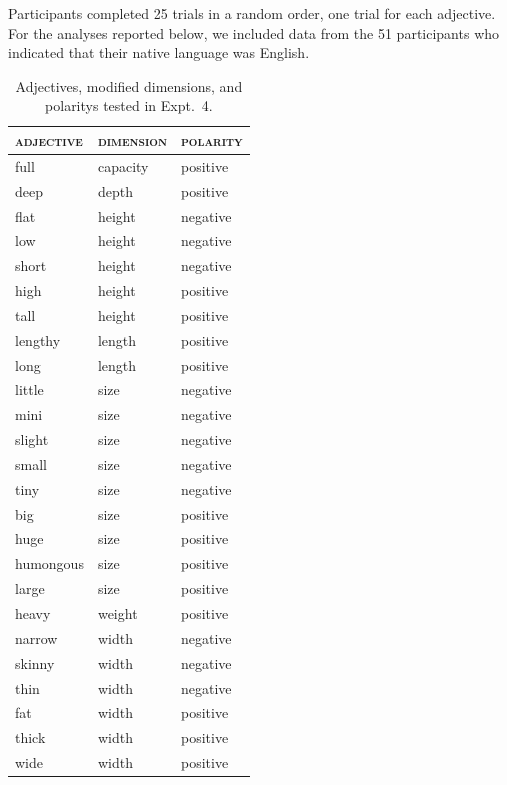 \documentclass[preprint,12pt,authoryear,titlepage]{elsarticle}
\begin{document}
Participants completed 25 trials in a random order, one trial for each adjective. For the analyses reported below, we included data from the 51 participants who indicated that their native language was English.

\begin{table}
	\centering
	\caption{Adjectives, modified dimensions, and polaritys tested in Expt.~4.}
	\label{dimensional-adjs}
\begin{tabular}{lll} \toprule
 	\textsc{adjective}	&	\textsc{dimension}	&	\textsc{polarity} \\ \midrule
	full				&	capacity			&	positive	\\
	deep				&	depth				&	positive	\\
	flat				&	height				&	negative	\\
	low					&	height				& 	negative	\\
	short				&	height				&	negative	\\
	high				&	height				&	positive	\\
	tall				&	height				&	positive	\\
	lengthy				&	length				&	positive	\\
	long				&	length				&	positive	\\	
	little				&	size				&	negative	\\		
	mini				&	size				&	negative	\\		
	slight				&	size				&	negative	\\
	small				&	size				&	negative	\\
	tiny				&	size				&	negative	\\		
	big					&	size				&	positive	\\
	huge				&	size				&	positive	\\
	humongous			&	size				&	positive	\\
	large				&	size				&	positive	\\
 	heavy				&	weight				&	positive	\\
	narrow				&	width				&	negative	\\
	skinny				&	width				&	negative	\\
	thin				&	width				&	negative	\\
	fat					&	width				&	positive	\\
	thick				&	width				&	positive	\\
	wide				&	width				&	positive	\\ \bottomrule
	\end{tabular}
	\end{table}
\end{document}
